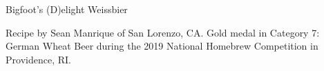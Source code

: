 \begin{recipe}{Bigfoot's (D)elight Weissbier} %

\begin{aboutblock}
Recipe by Sean Manrique of San Lorenzo, CA. Gold medal in Category 7: German
Wheat Beer during the 2019 National Homebrew Competition in Providence, RI.
\sourceaha
\end{aboutblock}


\begin{methodandtiming}
 
\begin{mashsteps}
\end{mashsteps}

\begin{fermentationsteps}
\end{fermentationsteps}

\end{methodandtiming}

\recipebreak

\begin{ingredientsblock}

\begin{malts}
\end{malts}

\begin{hops}
\end{hops}


\end{ingredientsblock}

\end{recipe}

